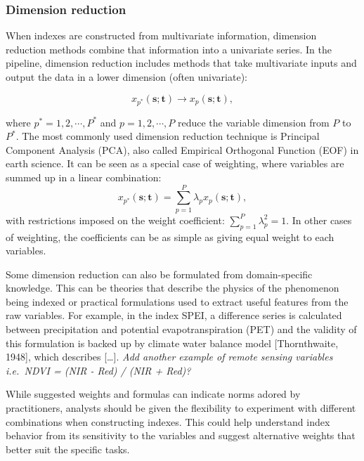 \documentclass[
]{article}
\begin{document}
\newpage

\hypertarget{dimension-reduction}{%
\subsubsection{Dimension reduction}\label{dimension-reduction}}

When indexes are constructed from multivariate information, dimension
reduction methods combine that information into a univariate series. In
the pipeline, dimension reduction includes methods that take
multivariate inputs and output the data in a lower dimension (often
univariate):

\begin{equation}
x_{p^*}(\mathbf{s}; \mathbf{t}) \rightarrow x_p(\mathbf{s}; \mathbf{t}),
\end{equation}

where \(p^* = 1, 2, \cdots, P^*\) and \(p = 1, 2, \cdots, P\) reduce the
variable dimension from \(P\) to \(P^*\). The most commonly used
dimension reduction technique is Principal Component Analysis (PCA),
also called Empirical Orthogonal Function (EOF) in earth science. It can
be seen as a special case of weighting, where variables are summed up in
a linear combination:
\[x_{p^*}(\mathbf{s}; \mathbf{t}) = \sum_{p = 1}^{P}\lambda_{p}x_p(\mathbf{s};\mathbf{t}),\]
with restrictions imposed on the weight coefficient:
\(\sum_{p=1}^P\lambda_p^2 = 1\). In other cases of weighting, the
coefficients can be as simple as giving equal weight to each variables.

Some dimension reduction can also be formulated from domain-specific
knowledge. This can be theories that describe the physics of the
phenomenon being indexed or practical formulations used to extract
useful features from the raw variables. For example, in the index SPEI,
a difference series is calculated between precipitation and potential
evapotranspiration (PET) and the validity of this formulation is backed
up by climate water balance model {[}Thornthwaite, 1948{]}, which
describes {[}\ldots{]}. \emph{Add another example of remote sensing
variables i.e.~NDVI = (NIR - Red) / (NIR + Red)?}

While suggested weights and formulas can indicate norms adored by
practitioners, analysts should be given the flexibility to experiment
with different combinations when constructing indexes. This could help
understand index behavior from its sensitivity to the variables and
suggest alternative weights that better suit the specific tasks.
\end{document}
